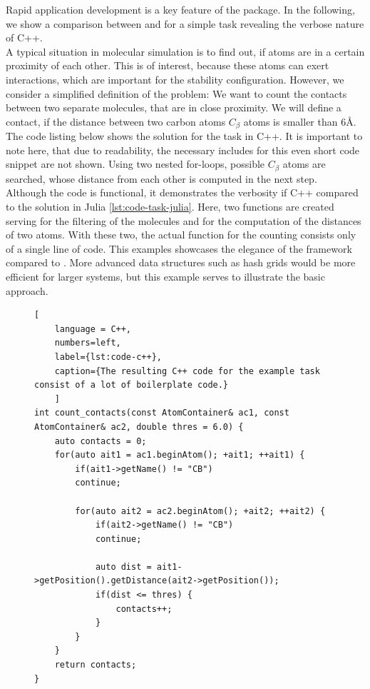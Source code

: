 Rapid application development is a key feature of the \biochem package. In the following, we show a comparison between \ball and \biochem for a simple task revealing the verbose nature of C++. \\
A typical situation in molecular simulation is to find out, if atoms are in a certain proximity of each other. This is of interest, because these atoms can exert interactions, which are important for the stability configuration. 
However, we consider a simplified definition of the problem: We want to count the contacts between two separate molecules, that are in close proximity. We will define a contact, if the distance between two carbon atoms $C_\beta$ atoms is smaller than $6$\AA. \\

The code listing below shows the solution for the task in C++. It is important to note here, that due to readability, the necessary includes for this even short code snippet are not shown. Using two nested for-loops, possible $C_\beta$ atoms are searched, whose distance from each other is computed in the next step. \\
Although the code is functional, it demonstrates the verbosity if C++ compared to the solution in Julia \ref{lst:code-task-julia}. Here, two functions are created serving for the filtering of the molecules and for the computation of the distances of two atoms. With these two, the actual function for the counting consists only of a single line of code. This examples showcases the elegance of the \biochem framework compared to \ball. 
More advanced data structures such as hash grids would be more efficient for larger systems, but this example serves to illustrate the basic approach.

\begin{figure}
\begin{lstlisting}[
	language = C++, 
	numbers=left, 
	label={lst:code-c++}, 
	caption={The resulting C++ code for the example task consist of a lot of boilerplate code.}
	]
int count_contacts(const AtomContainer& ac1, const AtomContainer& ac2, double thres = 6.0) {
	auto contacts = 0;
	for(auto ait1 = ac1.beginAtom(); +ait1; ++ait1) {
		if(ait1->getName() != "CB")
		continue;
		
		for(auto ait2 = ac2.beginAtom(); +ait2; ++ait2) {
			if(ait2->getName() != "CB")
			continue;
			
			auto dist = ait1->getPosition().getDistance(ait2->getPosition());
			if(dist <= thres) {
				contacts++;
			}
		}
	}
	return contacts;
}
\end{lstlisting}
\end{figure}


